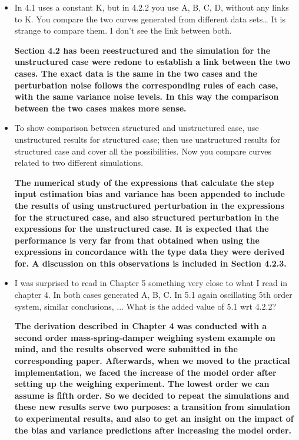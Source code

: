 \documentclass[11pt]{article}
\begin{document}
\begin{itemize}
	\item   In 4.1 uses a constant K, but in 4.2.2 you use A, B, C, D, without any links to K. You compare the two curves generated from different data sets… It is strange to compare them. I don't see the link between both.
	
	{\bfseries Section 4.2 has been reestructured and the simulation for the unstructured case were redone to establish a link between the two cases. The exact data is the same in the two cases and the perturbation noise follows the corresponding rules of each case, with the same variance noise levels. In this way the comparison between the two cases makes more sense.  }
	
	\item To show comparison between structured and unstructured case, use unstructured results for structured case; then use unstructured results for structured case and cover all the possibilities. Now you compare curves related to two different simulations.
		
	{\bfseries The numerical study of the expressions that calculate the step input estimation bias and variance has been appended to include the results of using unstructured perturbation in the expressions for the structured case, and also structured perturbation in the expressions for the unstructured case. It is expected that the performance is very far from that obtained when using the expressions in concordance with the type data they were derived for. A discussion on this observations is included in Section 4.2.3.}
	
	\item   I was surprised to read in Chapter 5 something very close to what I read in chapter 4. In both cases generated A, B, C. In 5.1 again oscillating 5th order system, similar conclusions, ... What is the added value of 5.1 wrt 4.2.2?
	
	{\bfseries The derivation described in Chapter 4 was conducted with a second order mass-spring-damper weighing system example on mind, and the results observed were submitted in the corresponding paper. Afterwards, when we moved to the practical implementation, we faced the increase of the model order after setting up the weighing experiment. The lowest order we can assume is fifth order. So we decided to repeat the simulations and these new results serve two purposes: a transition from simulation to experimental results, and also to get an insight on the impact of the bias and variance predictions after increasing the model order.    }
	

\end{itemize}
\end{document}
